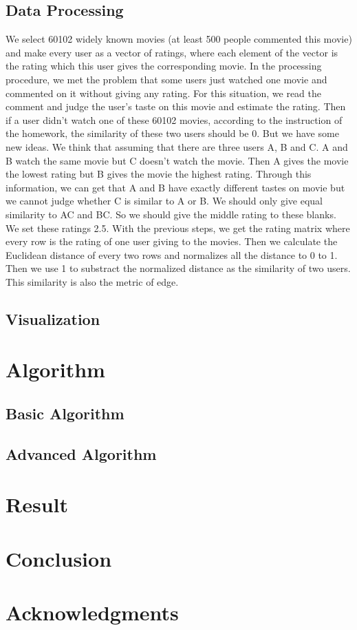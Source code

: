 \documentclass{article}
\begin{document}
\subsection{Data Processing}
We select 60102 widely known movies (at least 500 people commented this movie) and make every user as a vector of ratings, where each element of the vector is the rating which this user gives the corresponding movie. In the processing procedure, we met the problem that some users just watched one movie and commented on it without giving any rating. For this situation, we read the comment and judge the user's taste on this movie and estimate the rating. 
Then if a user didn't watch one of these 60102 movies, according to the instruction of the homework, the similarity of these two users should be 0. But we have some new ideas. We think that assuming that there are three users A, B and C. A and B watch the same movie but C doesn't watch the movie. Then A gives the movie the lowest rating but B gives the movie the highest rating. Through this information, we can get that A and B have exactly different tastes on movie but we cannot judge whether C is similar to A or B. We should only give equal similarity to AC and BC. So we should give the middle rating to these blanks. We set these ratings 2.5.
With the previous steps, we get the rating matrix where every row is the rating of one user giving to the movies. Then we calculate the Euclidean distance of every two rows and normalizes all the distance to 0 to 1. Then we use 1 to substract the normalized distance as the similarity of two users. This similarity is also the metric of edge.

\subsection{Visualization}

\section{Algorithm}
\subsection{Basic Algorithm}
 
\subsection{Advanced Algorithm}
 
\section{Result}
  
\section{Conclusion}


\section{Acknowledgments}
 

\begin{small}

 
\end{small}

\medskip
\end{document}

